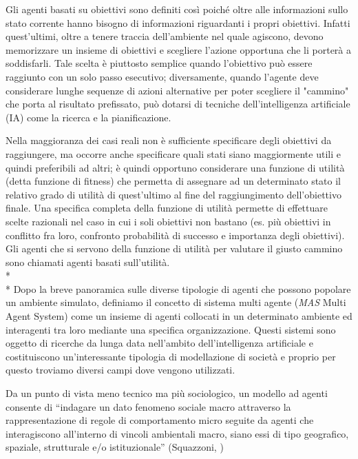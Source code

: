 \documentclass[12pt,a4paper,openright,twoside]{report}
\begin{document}
Gli agenti basati su obiettivi sono definiti così poiché oltre alle informazioni sullo stato corrente hanno bisogno di informazioni riguardanti i propri obiettivi. Infatti quest'ultimi, oltre a tenere traccia dell'ambiente nel quale agiscono, devono memorizzare un insieme di obiettivi  e scegliere   l'azione opportuna che li porterà a soddisfarli. Tale scelta è piuttosto semplice quando l'obiettivo può essere raggiunto con un solo passo esecutivo; diversamente, quando l'agente deve considerare lunghe sequenze di azioni alternative per poter scegliere il "cammino" che porta al risultato prefissato, può dotarsi di tecniche dell'intelligenza artificiale  (IA) come la ricerca e la pianificazione.

Nella maggioranza dei casi reali non è sufficiente specificare degli obiettivi da raggiungere, ma occorre anche specificare quali stati siano maggiormente utili e quindi preferibili ad altri; è quindi opportuno considerare una funzione di utilità (detta funzione di fitness) che permetta di assegnare ad un determinato stato il relativo grado di utilità di quest'ultimo al fine del raggiungimento dell'obiettivo finale. Una specifica completa della funzione di utilità permette di effettuare scelte razionali nel caso in cui i soli obiettivi non bastano (es. più obiettivi in conflitto fra loro, confronto probabilità di successo e importanza degli obiettivi). Gli agenti che si servono della funzione di utilità per valutare il giusto cammino sono chiamati agenti basati sull'utilità.
\\* \\*
Dopo la breve panoramica sulle diverse tipologie di agenti che possono popolare un ambiente simulato, definiamo il concetto di sistema multi agente (\emph{MAS} Multi Agent System) come un insieme di agenti collocati in un determinato ambiente ed interagenti tra loro mediante una specifica organizzazione. Questi sistemi sono oggetto di ricerche da lunga data nell'ambito dell'intelligenza artificiale e costituiscono un'interessante tipologia di modellazione di società e proprio per questo troviamo diversi campi dove vengono utilizzati.

Da un punto di vista meno tecnico ma più sociologico, un modello ad agenti consente di ``indagare un dato fenomeno sociale macro attraverso la rappresentazione di regole di comportamento micro seguite da agenti che interagiscono all'interno di vincoli ambientali macro, siano essi di tipo geografico, spaziale, strutturale e/o istituzionale'' (Squazzoni, \cite{Squazzoni})
\end{document}
